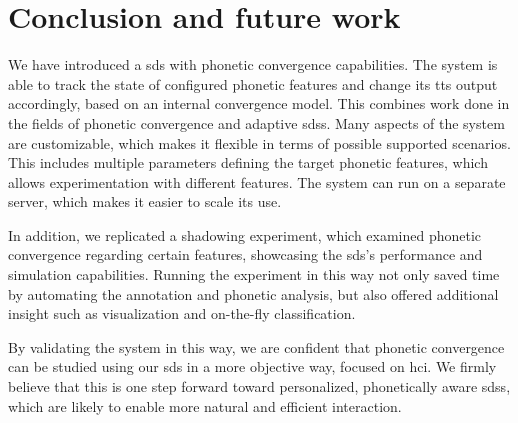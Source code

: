 \section{Conclusion and future work}
\label{sec:conclusion}

We have introduced a \acf{sds} with phonetic convergence capabilities.
The system is able to track the state of configured phonetic features and change its \acf{tts} output accordingly, based on an internal convergence model.
This combines work done in the fields of phonetic convergence and adaptive \acp{sds}.
Many aspects of the system are customizable, which makes it flexible in terms of possible supported scenarios.
This includes multiple parameters defining the target phonetic features, which allows experimentation with different features.
The system can run on a separate server, which makes it easier to scale its use.

In addition, we replicated a shadowing experiment, which examined phonetic convergence regarding certain features, showcasing the \ac{sds}'s performance and simulation capabilities.
Running the experiment in this way not only saved time by automating the annotation and phonetic analysis, but also offered additional insight such as visualization and on-the-fly classification.

By validating the system in this way, we are confident that phonetic convergence can be studied using our \ac{sds} in a more objective way, focused on \ac{hci}.
We firmly believe that this is one step forward toward personalized, phonetically aware \acp{sds}, which are likely to enable more natural and efficient interaction.

